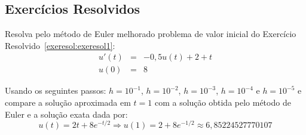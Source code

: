 \subsection*{Exercícios Resolvidos}
\begin{exeresol}\label{exeresol:exeresol1_euler_melhorado} Resolva pelo método de Euler melhorado problema de valor inicial do Exercício Resolvido~\ref{exeresol:exeresol1}:
\begin{eqnarray}
     u'(t)&=& -0,5u(t)+2+t\\
            u(0) &=&  8
\end{eqnarray}

Usando os seguintes passos: $h=10^{-1}$, $h=10^{-2}$, $h=10^{-3}$, $h=10^{-4}$ e $h=10^{-5}$ e compare a solução aproximada em $t=1$ com a solução obtida pelo método de Euler e a solução exata dada por:
\begin{equation}
     u(t) = 2t+8e^{-t/2} \Longrightarrow u(1)=2+8e^{-1/2} \approx 6,85224527770107
\end{equation}
\end{exeresol}
